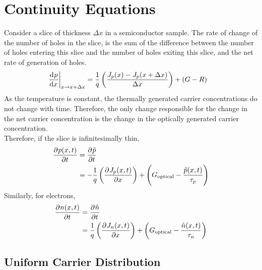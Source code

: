 \documentclass[titlepage, fleqn, a4paper, 12pt, twoside]{article}
\theoremstyle{definition}
\theoremstyle{theorem}
\begin{document}
\section{Continuity Equations}

Consider a slice of thickness $\Delta x$ in a semiconductor sample.
The rate of change of the number of holes in the slice, is the sum of the difference between the number of holes entering this slice and the number of holes exiting this slice, and the net rate of generation of holes.
\begin{align*}
	\left. \dod{p}{x} \right|_{x \to x + \Delta x} &= \frac{1}{q} \left( \frac{J_p(x) - J_p(x + \Delta x)}{\Delta x} \right) + (G - R)
\end{align*}
As the temperature is constant, the thermally generated carrier concentrations do not change with time.
Therefore, the only change responsible for the change in the net carrier concentration is the change in the optically generated carrier concentration.\\
Therefore, if the slice is infinitesimally thin,
\begin{align*}
	\dpd{p(x,t)}{t} &= \dpd{\hat{p}}{t}\\
	&= -\frac{1}{q} \left( \dpd{J_p(x,t)}{x} \right) + \left( G_{\text{optical}} - \frac{\hat{p}(x,t)}{\tau_p} \right)
\end{align*}
Similarly, for electrons,
\begin{align*}
	\dpd{n(x,t)}{t} &= \dpd{\hat{n}}{t}\\
	&= \frac{1}{q} \left( \dpd{J_n(x,t)}{x} \right) + \left( G_{\text{optical}} - \frac{\hat{n}(x,t)}{\tau_n} \right)
\end{align*}

\subsection{Uniform Carrier Distribution}
\end{document}

